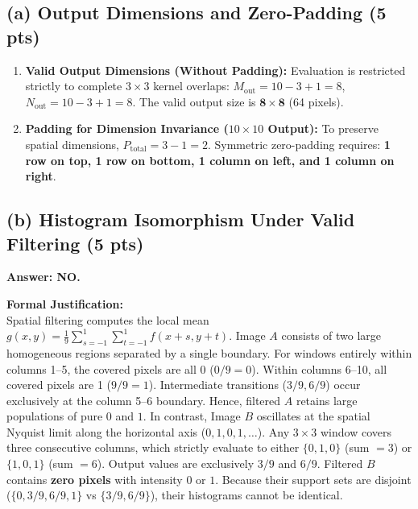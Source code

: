 \documentclass[11pt,a4paper]{article}
\begin{document}
\subsection{(a) Output Dimensions and Zero-Padding (5 pts)}
\begin{enumerate}
    \item \textbf{Valid Output Dimensions (Without Padding):} Evaluation is restricted strictly to complete $3 \times 3$ kernel overlaps: $M_{\text{out}} = 10 - 3 + 1 = 8$, $N_{\text{out}} = 10 - 3 + 1 = 8$. The valid output size is $\mathbf{8 \times 8}$ (64 pixels).
    \item \textbf{Padding for Dimension Invariance ($10 \times 10$ Output):} To preserve spatial dimensions, $P_{\text{total}} = 3 - 1 = 2$. Symmetric zero-padding requires: \textbf{1 row on top, 1 row on bottom, 1 column on left, and 1 column on right}.
\end{enumerate}

\subsection{(b) Histogram Isomorphism Under Valid Filtering (5 pts)}
\noindent\textbf{Answer: NO.}

\noindent\textbf{Formal Justification:}\\
Spatial filtering computes the local mean $g(x, y) = \frac{1}{9} \sum_{s=-1}^1 \sum_{t=-1}^1 f(x+s, y+t)$.
Image $A$ consists of two large homogeneous regions separated by a single boundary. For windows entirely within columns 1--5, the covered pixels are all 0 ($0/9 = 0$). Within columns 6--10, all covered pixels are 1 ($9/9 = 1$). Intermediate transitions ($3/9, 6/9$) occur exclusively at the column 5--6 boundary. Hence, filtered $A$ retains large populations of pure $0$ and $1$.
In contrast, Image $B$ oscillates at the spatial Nyquist limit along the horizontal axis ($0, 1, 0, 1, \dots$). Any $3 \times 3$ window covers three consecutive columns, which strictly evaluate to either $\{0, 1, 0\}$ (sum $= 3$) or $\{1, 0, 1\}$ (sum $= 6$). Output values are exclusively $3/9$ and $6/9$. Filtered $B$ contains \textbf{zero pixels} with intensity $0$ or $1$. Because their support sets are disjoint ($\{0, 3/9, 6/9, 1\}$ vs $\{3/9, 6/9\}$), their histograms cannot be identical.
\end{document}
